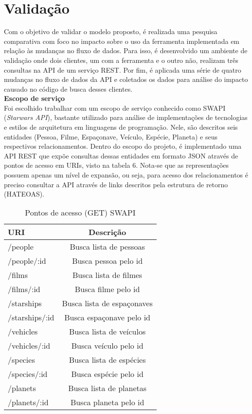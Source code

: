 \section{Validação}

Com o objetivo de validar o modelo proposto, é realizada uma pesquisa comparativa com foco no impacto sobre o uso da ferramenta implementada em relação às mudanças no fluxo de dados. Para isso, é desenvolvido um ambiente de validação onde dois clientes, um com a ferramenta e o outro não, realizam três consultas na API de um serviço REST. Por fim, é aplicada uma série de quatro mudanças no fluxo de dados da API e coletados os dados para análise do impacto causado no código de busca desses clientes. \\

\textbf{Escopo de serviço} \\

Foi escolhido trabalhar com um escopo de serviço conhecido como SWAPI (\textit{Starwars API}), bastante utilizado para análise de implementações de tecnologias e estilos de arquitetura em linguagens de programação. Nele, são descritos seis entidades (Pessoa, Filme, Espaçonave, Veículo, Espécie, Planeta) e seus respectivos relacionamentos. Dentro do escopo do projeto, é implementado uma API REST que expõe consultas dessas entidades em formato JSON através de pontos de acesso em URIs, visto na tabela 6. Nota-se que as representações possuem apenas um nível de expansão, ou seja, para acesso dos relacionamentos é preciso consultar a API através de links descritos pela estrutura de retorno (HATEOAS).

\begin{table}[H]
  \centering
  \begin{tabular}{|l|c|}
    \hline
    URI & Descrição \\
    \hline
    /people & Busca lista de pessoas \\
    \hline
    /people/:id & Busca pessoa pelo id \\
    \hline
    /films & Busca lista de filmes \\
    \hline
    /films/:id & Busca filme pelo id \\
    \hline
    /starships & Busca lista de espaçonaves \\
    \hline
    /starships/:id & Busca espaçonave pelo id \\
    \hline
    /vehicles & Busca lista de veículos \\
    \hline
    /vehicles/:id & Busca veículo pelo id \\
    \hline
    /species & Busca lista de espécies \\
    \hline
    /species/:id & Busca espécie pelo id \\
    \hline
    /planets & Busca lista de planetas \\
    \hline
    /planets/:id & Busca planeta pelo id \\
    \hline
  \end{tabular}
  \caption{Pontos de acesso (GET) SWAPI}
\end{table}

